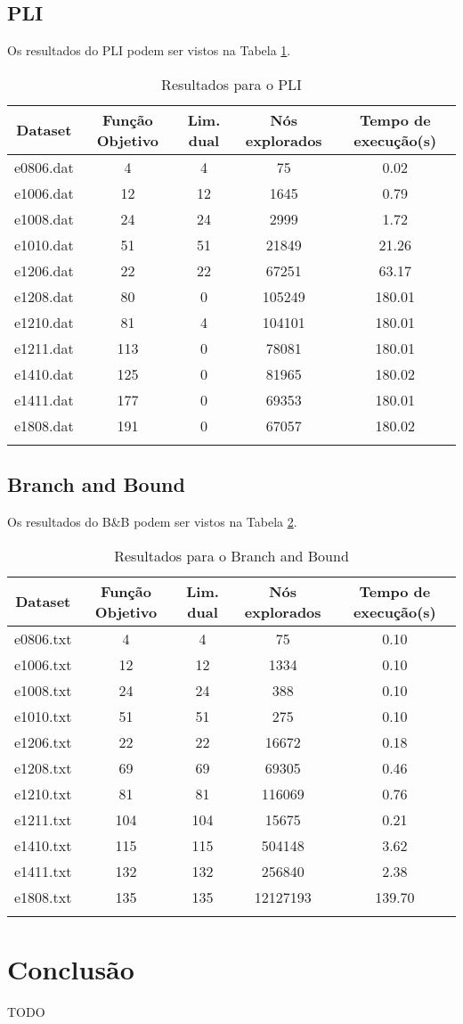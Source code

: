 \documentclass[a4paper,11pt]{article}
\begin{document}
\subsection{PLI}
Os resultados do PLI podem ser vistos na Tabela \ref{pli}.

\begin{longtable}{c c c c c}
  Dataset & Função Objetivo & Lim. dual & Nós explorados & Tempo de execução(s) \\
  \hline
  \endhead
  e0806.dat & 4   & 4  & 75     & 0.02   \\
  e1006.dat & 12  & 12 & 1645   & 0.79   \\
  e1008.dat & 24  & 24 & 2999   & 1.72   \\
  e1010.dat & 51  & 51 & 21849  & 21.26  \\
  e1206.dat & 22  & 22 & 67251  & 63.17  \\
  e1208.dat & 80  & 0  & 105249 & 180.01 \\
  e1210.dat & 81  & 4  & 104101 & 180.01 \\
  e1211.dat & 113 & 0  & 78081  & 180.01 \\
  e1410.dat & 125 & 0  & 81965  & 180.02 \\
  e1411.dat & 177 & 0  & 69353  & 180.01 \\
  e1808.dat & 191 & 0  & 67057  & 180.02 \\
  \caption{Resultados para o PLI}
  \label{pli}
\end{longtable}

\subsection{Branch and Bound}
Os resultados do B\&B podem ser vistos na Tabela \ref{bnb}.

\begin{longtable}{c c c c c}
  Dataset & Função Objetivo & Lim. dual & Nós explorados & Tempo de execução(s) \\
  \hline
  \endhead
  e0806.txt & 4   & 4   & 75       & 0.10 \\
  e1006.txt & 12  & 12  & 1334     & 0.10 \\
  e1008.txt & 24  & 24  & 388      & 0.10 \\
  e1010.txt & 51  & 51  & 275      & 0.10 \\
  e1206.txt & 22  & 22  & 16672    & 0.18 \\
  e1208.txt & 69  & 69  & 69305    & 0.46 \\
  e1210.txt & 81  & 81  & 116069   & 0.76 \\
  e1211.txt & 104 & 104 & 15675    & 0.21 \\
  e1410.txt & 115 & 115 & 504148   & 3.62 \\
  e1411.txt & 132 & 132 & 256840   & 2.38 \\
  e1808.txt & 135 & 135 & 12127193 & 139.70 \\
  \caption{Resultados para o Branch and Bound}
  \label{bnb}
\end{longtable}

\section{Conclusão}
TODO
\end{document}
